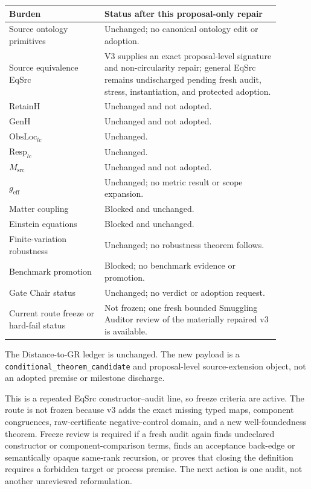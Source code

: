 \documentclass[11pt]{article}
\begin{document}
\begin{longtable}{p{0.31\linewidth}p{0.58\linewidth}}
\toprule
Burden & Status after this proposal-only repair \\
\midrule
Source ontology primitives & Unchanged; no canonical ontology edit or adoption. \\
Source equivalence EqSrc & V3 supplies an exact proposal-level signature and non-circularity repair; general EqSrc remains undischarged pending fresh audit, stress, instantiation, and protected adoption. \\
RetainH & Unchanged and not adopted. \\
GenH & Unchanged and not adopted. \\
\(\mathrm{ObsLoc}_{lc}\) & Unchanged. \\
\(\mathrm{Resp}_{lc}\) & Unchanged. \\
\(M_{\mathrm{src}}\) & Unchanged and not adopted. \\
\(g_{\mathrm{eff}}\) & Unchanged; no metric result or scope expansion. \\
Matter coupling & Blocked and unchanged. \\
Einstein equations & Blocked and unchanged. \\
Finite-variation robustness & Unchanged; no robustness theorem follows. \\
Benchmark promotion & Blocked; no benchmark evidence or promotion. \\
Gate Chair status & Unchanged; no verdict or adoption request. \\
Current route freeze or hard-fail status & Not frozen; one fresh bounded Smuggling Auditor review of the materially repaired v3 is available. \\
\bottomrule
\end{longtable}

The Distance-to-GR ledger is unchanged. The new payload is a
\texttt{conditional\_theorem\_candidate} and proposal-level source-extension
object, not an adopted premise or milestone discharge.

This is a repeated EqSrc constructor--audit line, so freeze criteria are
active. The route is not frozen because v3 adds the exact missing typed maps,
component congruences, raw-certificate negative-control domain, and a new
well-foundedness theorem. Freeze review is required if a fresh audit again
finds undeclared constructor or component-comparison terms, finds an
acceptance back-edge or semantically opaque same-rank recursion, or proves that
closing the definition requires a forbidden target or process premise. The
next action is one audit, not another unreviewed reformulation.
\end{document}
